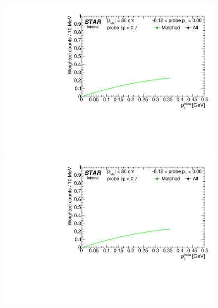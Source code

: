 \begin{figure}[h!]
{}%
\end{figure}%
\begin{figure}[ht]\ContinuedFloat
\centering
\parbox{0.495\textwidth}{
  \centering
  \includegraphics[width=\linewidth,page=7]{graphics/systematicsEfficiency/TOF_tagAndProbe/Fitting_effVsPt_data.CPT.pdf}\\
  \includegraphics[width=\linewidth,page=8]{graphics/systematicsEfficiency/TOF_tagAndProbe/Fitting_effVsPt_data.CPT.pdf}\\
}
\end{figure}
